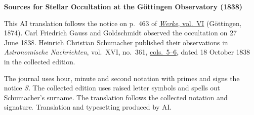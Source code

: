 \clearpage\thispagestyle{empty}
\begin{center}\textbf{Sources for Stellar Occultation at the Göttingen Observatory (1838)}\end{center}
\noindent This AI translation follows the notice on p.~463 of \href{https://gdz.sub.uni-goettingen.de/id/PPN236007467}{\textit{Werke}, vol.~VI} (Göttingen, 1874). Carl Friedrich Gauss and Goldschmidt observed the occultation on 27 June 1838. Heinrich Christian Schumacher published their observations in \textit{Astronomische Nachrichten}, vol.~XVI, no.~361, \href{https://api.digitale-sammlungen.de/iiif/image/v2/bsb10049441_00011/full/1800,/0/default.jpg}{cols.~5--6}, dated 18 October 1838 in the collected edition.
\par\smallskip\noindent The journal uses hour, minute and second notation with primes and signs the notice \textit{S.} The collected edition uses raised letter symbols and spells out Schumacher’s surname. The translation follows the collected notation and signature. Translation and typesetting produced by AI.
\clearpage

